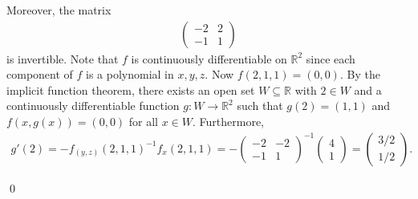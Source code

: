 \documentclass[11pt]{amsart}
\theoremstyle{plain}
\numberwithin{equation}{section}
\begin{document}
\begin{enumerate}[label=\textbf{(\alph*)}]
Moreover, the matrix
\begin{align*}
    \begin{pmatrix}
        -2 & 2 \\ -1 & 1
    \end{pmatrix}
\end{align*}
is invertible. Note that $f$ is continuously differentiable on $\mathbb{R}^{2}$ since each component of $f$ is a polynomial in $x,y,z$. Now $f(2,1,1)=(0,0)$. By the implicit function theorem, there exists an open set $W\subseteq\mathbb{R}$ with $2\in W$ and a continuously differentiable function $g:W\longrightarrow\mathbb{R}^{2}$ such that $g(2)=(1,1)$ and $f\left(x,g(x)\right)=(0,0)$ for all $x\in W$. Furthermore,
\begin{align*}
    g'(2)=-f_{(y,z)}(2,1,1)^{-1}f_{x}(2,1,1)=-\begin{pmatrix}
        -2 & -2 \\ -1 & 1
    \end{pmatrix}^{-1}\begin{pmatrix}
        4 \\ 1
    \end{pmatrix}=\begin{pmatrix}
        3/2 \\ 1/2
    \end{pmatrix}.
\end{align*}
\end{enumerate}
\qed 
\end{document}
